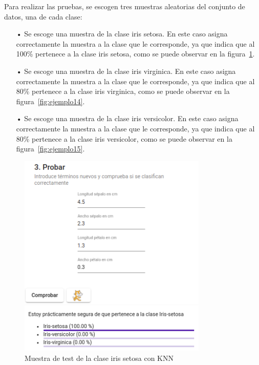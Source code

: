 \documentclass[a4paper, 12pt]{book}
\begin{document}
Para realizar las pruebas, se escogen tres muestras aleatorias del conjunto de datos, una de cada clase:

\begin{itemize}
\item[•] Se escoge una muestra de la clase iris setosa. En este caso asigna correctamente la muestra a la clase que le corresponde, ya que indica que al 100\% pertenece a la clase iris setosa, como se puede observar en la figura~\ref{fig:ejemplo13}.

\item[•] Se escoge una muestra de la clase iris virginica. En este caso asigna correctamente la muestra a la clase que le corresponde, ya que indica que al 80\% pertenece a la clase iris virginica, como se puede observar en la figura~\ref{fig:ejemplo14}.

\item[•] Se escoge una muestra de la clase iris versicolor. En este caso asigna correctamente la muestra a la clase que le corresponde, ya que indica que al 80\% pertenece a la clase iris versicolor, como se puede observar en la figura~\ref{fig:ejemplo15}.
\end{itemize}

\begin{figure}
	\centering
	\includegraphics[width=9cm, keepaspectratio]{img/iris_set_num_knn.png}
	\caption{Muestra de test de la clase iris setosa con KNN} 	\label{fig:ejemplo13}
\end{figure}
\end{document}
